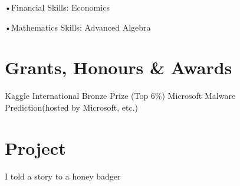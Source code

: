 \documentclass[11pt]{article}
\begin{document}
•Financial Skills: Economics

\vspace{0.01\textheight}

•Mathematics Skills:  Advanced Algebra



\section*{Grants, Honours \& Awards}

Kaggle International Bronze Prize (Top 6\%) Microsoft Malware Prediction(hosted by Microsoft, etc.)


\section*{Project}
 I told a story to a honey badger
\end{document}
